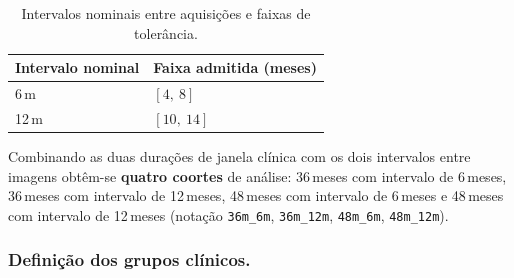 \documentclass[review]{elsarticle}
\newcommand{\code}[1]{\texttt{#1}}
\begin{document}
	\begin{table}[htbp]
		\centering
		\caption{Intervalos nominais entre aquisições e faixas de tolerância.}
		\label{tab:bandas}
			\begin{tabular}{ll}
				\toprule
				Intervalo nominal & Faixa admitida (meses) \\
				\midrule
				6\,m  & $[4,\ 8]$ \\
				12\,m & $[10,\ 14]$ \\
				\bottomrule
			\end{tabular}
	\end{table}
	
	Combinando as duas durações de janela clínica com os dois intervalos entre imagens obtêm-se \textbf{quatro coortes} de análise: 36\,meses com intervalo de 6\,meses, 36\,meses com intervalo de 12\,meses, 48\,meses com intervalo de 6\,meses e 48\,meses com intervalo de 12\,meses (notação \code{36m\_6m}, \code{36m\_12m}, \code{48m\_6m}, \code{48m\_12m}).
	
	\subsubsection{Definição dos grupos clínicos.}
	
\end{document}
